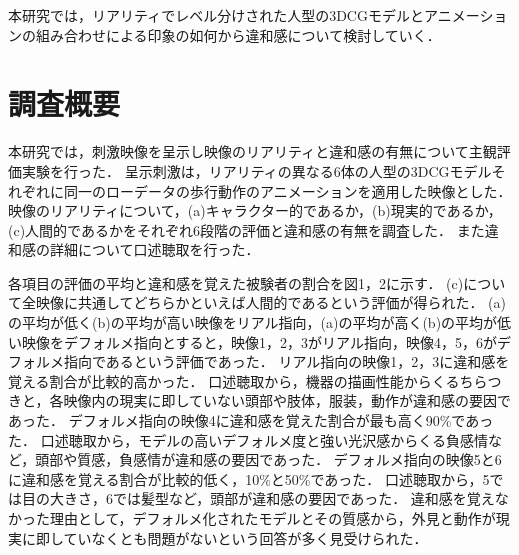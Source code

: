\documentclass[twocolumn,10pt,a4j]{ltjsarticle}
\begin{document}
本研究では，リアリティでレベル分けされた人型の3DCGモデルとアニメーションの組み合わせによる印象の如何から違和感について検討していく．

\section{調査概要}
本研究では，刺激映像を呈示し映像のリアリティと違和感の有無について主観評価実験を行った．
呈示刺激は，リアリティの異なる6体の人型の3DCGモデルそれぞれに同一のローデータの歩行動作のアニメーションを適用した映像とした．
映像のリアリティについて，(a)キャラクター的であるか，(b)現実的であるか，(c)人間的であるかをそれぞれ6段階の評価と違和感の有無を調査した．
また違和感の詳細について口述聴取を行った．

各項目の評価の平均と違和感を覚えた被験者の割合を図1，2に示す．
(c)について全映像に共通してどちらかといえば人間的であるという評価が得られた．
(a)の平均が低く(b)の平均が高い映像をリアル指向，(a)の平均が高く(b)の平均が低い映像をデフォルメ指向とすると，映像1，2，3がリアル指向，映像4，5，6がデフォルメ指向であるという評価であった．
リアル指向の映像1，2，3に違和感を覚える割合が比較的高かった．
口述聴取から，機器の描画性能からくるちらつきと，各映像内の現実に即していない頭部や肢体，服装，動作が違和感の要因であった．
デフォルメ指向の映像4に違和感を覚えた割合が最も高く90\%であった．
口述聴取から，モデルの高いデフォルメ度と強い光沢感からくる負感情など，頭部や質感，負感情が違和感の要因であった．
デフォルメ指向の映像5と6に違和感を覚える割合が比較的低く，10\%と50\%であった．
口述聴取から，5では目の大きさ，6では髪型など，頭部が違和感の要因であった．
違和感を覚えなかった理由として，デフォルメ化されたモデルとその質感から，外見と動作が現実に即していなくとも問題がないという回答が多く見受けられた．

\end{document}
